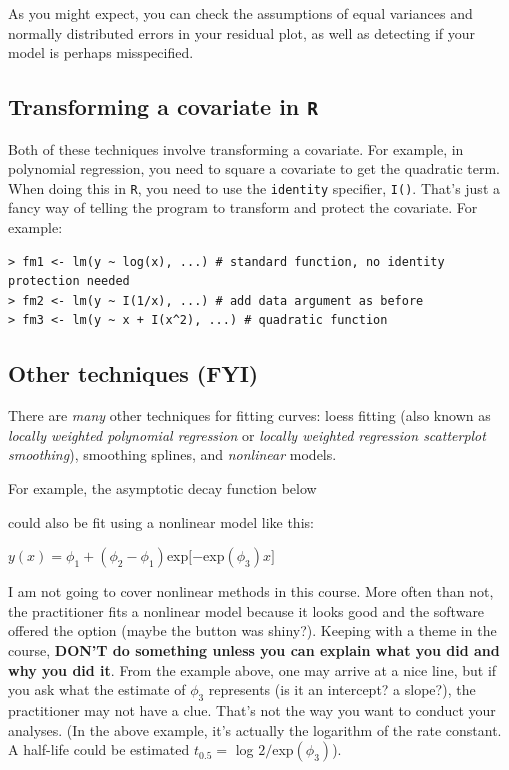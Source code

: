 \documentclass[
  letterpaper,
  DIV=11,
  numbers=noendperiod]{scrartcl}
\begin{document}
As you might expect, you can check the assumptions of equal variances
and normally distributed errors in your residual plot, as well as
detecting if your model is perhaps misspecified.

\subsection{\texorpdfstring{Transforming a covariate in
\texttt{R}}{Transforming a covariate in R}}\label{transforming-a-covariate-in-r}

Both of these techniques involve transforming a covariate. For example,
in polynomial regression, you need to square a covariate to get the
quadratic term. When doing this in \texttt{R}, you need to use the
\texttt{identity} specifier, \texttt{I()}. That's just a fancy way of
telling the program to transform and protect the covariate. For example:

\begin{verbatim}
> fm1 <- lm(y ~ log(x), ...) # standard function, no identity protection needed
> fm2 <- lm(y ~ I(1/x), ...) # add data argument as before
> fm3 <- lm(y ~ x + I(x^2), ...) # quadratic function
\end{verbatim}

\subsection{Other techniques (FYI)}\label{other-techniques-fyi}

There are \emph{many} other techniques for fitting curves: loess fitting
(also known as \emph{locally weighted polynomial regression} or
\emph{locally weighted regression scatterplot smoothing}), smoothing
splines, and \emph{nonlinear} models.

For example, the asymptotic decay function below

could also be fit using a nonlinear model like this:

\(y(x) = \phi_1 + (\phi_2-\phi_1)\)exp\([-\)exp\((\phi_3)x]\)

I am not going to cover nonlinear methods in this course. More often
than not, the practitioner fits a nonlinear model because it looks good
and the software offered the option (maybe the button was shiny?).
Keeping with a theme in the course, \textbf{DON'T do something unless
you can explain what you did and why you did it}. From the example
above, one may arrive at a nice line, but if you ask what the estimate
of \(\phi_3\) represents (is it an intercept? a slope?), the
practitioner may not have a clue. That's not the way you want to conduct
your analyses. (In the above example, it's actually the logarithm of the
rate constant. A half-life could be estimated \(t_{0.5} =\) log
\(2/\)exp\((\phi_3)\)).
\end{document}
